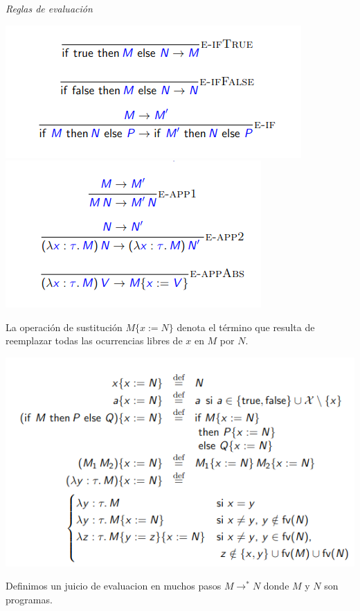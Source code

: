 \documentclass[12pt]{extarticle}
\begin{document}
\textit{Reglas de evaluación}
\begin{center}
\includegraphics[scale=0.6]{reglas-sm1.png}
\includegraphics[scale=0.6]{reglas-sm2.png}
\end{center}

La operación de sustitución $M \{x := N\}$ denota el término que resulta de reemplazar todas las ocurrencias libres de $x$ en $M$ por $N$.

\begin{center}
\includegraphics[scale=0.6]{sustitucion.png}
\end{center}

Definimos un juicio de evaluacion en muchos pasos $ M\rightarrow^* N$ donde $M$ y $N$ son programas.
\end{document}
